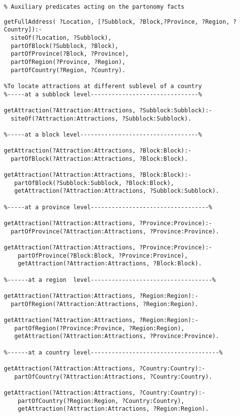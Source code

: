 \begin{verbatim}
% Auxiliary predicates acting on the partonomy facts
\end{verbatim}
\vspace{-0.25in}
\footnotesize
\begin{verbatim}
getFullAddress( ?Location, [?Subblock, ?Block,?Province, ?Region, ?Country]):-
  siteOf(?Location, ?Subblock),
  partOfBlock(?Subblock, ?Block),
  partOfProvince(?Block, ?Province),
  partOfRegion(?Province, ?Region),
  partOfCountry(?Region, ?Country).

%To locate attractions at different sublevel of a country
%-----at a subblock level-------------------------------%

getAttraction(?Attraction:Attractions, ?Subblock:Subblock):-
  siteOf(?Attraction:Attractions, ?Subblock:Subblock).
 
%-----at a block level----------------------------------%

getAttraction(?Attraction:Attractions, ?Block:Block):-
  partOfBlock(?Attraction:Attractions, ?Block:Block).
  
getAttraction(?Attraction:Attractions, ?Block:Block):-
   partOfBlock(?Subblock:Subblock, ?Block:Block),
   getAttraction(?Attraction:Attractions, ?Subblock:Subblock).

%-----at a province level----------------------------------%

getAttraction(?Attraction:Attractions, ?Province:Province):-
  partOfProvince(?Attraction:Attractions, ?Province:Province).
  
getAttraction(?Attraction:Attractions, ?Province:Province):-
    partOfProvince(?Block:Block, ?Province:Province),
    getAttraction(?Attraction:Attractions, ?Block:Block).

%------at a region  level-----------------------------------%

getAttraction(?Attraction:Attractions, ?Region:Region):-
  partOfRegion(?Attraction:Attractions, ?Region:Region).
    
getAttraction(?Attraction:Attractions, ?Region:Region):-
   partOfRegion(?Province:Province, ?Region:Region),
   getAttraction(?Attraction:Attractions, ?Province:Province).
  
%------at a country level-------------------------------------%

getAttraction(?Attraction:Attractions, ?Country:Country):-
   partOfCountry(?Attraction:Attractions, ?Country:Country).

getAttraction(?Attraction:Attractions, ?Country:Country):-
    partOfCountry(?Region:Region, ?Country:Country),
    getAttraction(?Attraction:Attractions, ?Region:Region).
\end{verbatim}
\onecolumn

